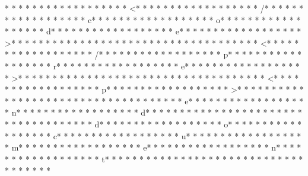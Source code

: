 * * *  * * *  * * *  *  * * *  *  * * *  * <* * *  * * *  * * *  *  * * *  *  * * *  * /* * *  * * *  * * *  *  * * *  *  * * *  * c* * *  * * *  * * *  *  * * *  *  * * *  * o* * *  * * *  * * *  *  * * *  *  * * *  * d* * *  * * *  * * *  *  * * *  *  * * *  * e* * *  * * *  * * *  *  * * *  *  * * *  * >* * *  * * *  * * *  *  * * *  *  * * *  * 
* * *  * * *  * * *  *  * * *  *  * * *  * <* * *  * * *  * * *  *  * * *  *  * * *  * /* * *  * * *  * * *  *  * * *  *  * * *  * p* * *  * * *  * * *  *  * * *  *  * * *  * r* * *  * * *  * * *  *  * * *  *  * * *  * e* * *  * * *  * * *  *  * * *  *  * * *  * >* * *  * * *  * * *  *  * * *  *  * * *  * 
* * *  * * *  * * *  *  * * *  *  * * *  * <* * *  * * *  * * *  *  * * *  *  * * *  * p* * *  * * *  * * *  *  * * *  *  * * *  * >* * *  * * *  * * *  *  * * *  *  * * *  * 
* * *  * * *  * * *  *  * * *  *  * * *  * e* * *  * * *  * * *  *  * * *  *  * * *  * n* * *  * * *  * * *  *  * * *  *  * * *  * d* * *  * * *  * * *  *  * * *  *  * * *  * {* * *  * * *  * * *  *  * * *  *  * * *  * d* * *  * * *  * * *  *  * * *  *  * * *  * o* * *  * * *  * * *  *  * * *  *  * * *  * c* * *  * * *  * * *  *  * * *  *  * * *  * u* * *  * * *  * * *  *  * * *  *  * * *  * m* * *  * * *  * * *  *  * * *  *  * * *  * e* * *  * * *  * * *  *  * * *  *  * * *  * n* * *  * * *  * * *  *  * * *  *  * * *  * t* * *  * * *  * * *  *  * * *  *  * * *  * }* * *  * * *  * * *  *  * * *  *  * * *  * 
